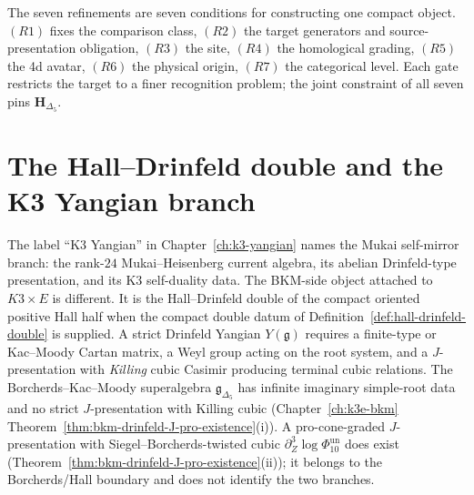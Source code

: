 The seven refinements are seven conditions for constructing one compact
object. $(R1)$ fixes the comparison class, $(R2)$ the target
generators and source-presentation obligation, $(R3)$ the site,
$(R4)$ the homological grading, $(R5)$ the 4d avatar, $(R6)$ the
physical origin, $(R7)$ the categorical level. Each gate restricts
the target to a finer recognition problem; the joint constraint of
all seven pins $\mathbf{H}_{\Delta_5}$.

\section{The Hall--Drinfeld double and the K3 Yangian branch}
\label{sec:hall-drinfeld-double-k3}

\begin{remark}
\label{rem:k3-not-yangian-strict}
The label ``K3 Yangian'' in Chapter~\ref{ch:k3-yangian} names the
Mukai self-mirror branch: the rank-$24$ Mukai--Heisenberg current
algebra, its abelian Drinfeld-type presentation, and its K3
self-duality data. The BKM-side object attached to \(K3\times E\) is
different. It is the Hall--Drinfeld double of the compact oriented
positive Hall half when the compact double datum of
Definition~\ref{def:hall-drinfeld-double} is supplied. A strict
Drinfeld Yangian $Y(\mathfrak{g})$ requires a finite-type or Kac--Moody
Cartan matrix, a Weyl group acting on the root system, and a
$J$-presentation with \emph{Killing} cubic Casimir producing terminal
cubic relations. The Borcherds--Kac--Moody superalgebra
\(\mathfrak g_{\Delta_5}\) has infinite imaginary simple-root data and
no strict $J$-presentation with Killing cubic
(Chapter~\ref{ch:k3e-bkm} Theorem~\ref{thm:bkm-drinfeld-J-pro-existence}(i)).
A pro-cone-graded $J$-presentation with Siegel--Borcherds-twisted cubic
\(\partial^3_Z\log\Phi_{10}^{\mathrm{un}}\) does exist
(Theorem~\ref{thm:bkm-drinfeld-J-pro-existence}(ii)); it belongs to the
Borcherds/Hall boundary and does not identify the two branches.
\end{remark}

